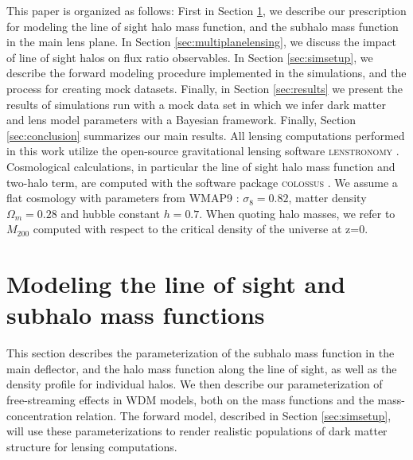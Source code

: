 This paper is organized as follows: First in Section \ref{sec:rendering}, we describe our prescription for modeling the line of sight halo mass function, and the subhalo mass function in the main lens plane. In Section \ref{sec:multiplanelensing}, we discuss the impact of line of sight halos on flux ratio observables. In Section \ref{sec:simsetup}, we describe the forward modeling procedure implemented in the simulations, and the process for creating mock datasets. Finally, in Section \ref{sec:results} we present the results of simulations run with a mock data set in which we infer dark matter and lens model parameters with a Bayesian framework. Finally, Section \ref{sec:conclusion} summarizes our main results. All lensing computations performed in this work utilize the open-source gravitational lensing software {\textsc{lenstronomy}} \cite{Birrer++15,BirrerAmara18}. Cosmological calculations, in particular the line of sight halo mass function and two-halo term, are computed with the software package {\textsc{colossus}} \cite{Diemer17}. We assume a flat cosmology with parameters from WMAP9 \cite{WMAP9cosmo}: $\sigma_8 = 0.82$, matter density $\Omega_{m} = 0.28$ and hubble constant $h = 0.7$. When quoting halo masses, we refer to $M_{200}$ computed with respect to the critical density of the universe at z=0.

\section{Modeling the  line of sight and subhalo mass functions}
\label{sec:rendering}

This section describes the parameterization of the subhalo mass function in the main deflector, and the halo mass function along the line of sight, as well as the density profile for individual halos. We then describe our parameterization of free-streaming effects in WDM models, both on the mass functions and the mass-concentration relation. The forward model, described in Section \ref{sec:simsetup}, will use these parameterizations to render realistic populations of dark matter structure for lensing computations.

